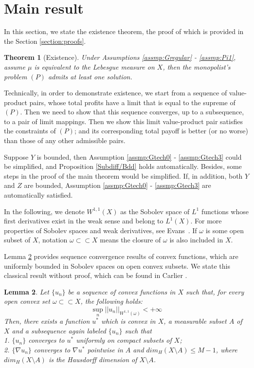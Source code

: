 \documentclass[a4paper, 11pt]{amsart}
\numberwithin{equation}{section}
\theoremstyle{plain}
\newtheorem{theorem}{Theorem}[section]
\newtheorem{lemma}[theorem]{Lemma}
\theoremstyle{definition}
\theoremstyle{remark}
\begin{document}
\section{Main result}\label{section:mainresult}
In this section, we state the existence theorem, the proof of which is provided in the Section \ref{section:proofs}. 


\begin{theorem}[Existence]
	Under Assumptions \ref{assmp:Gregular} - \ref{assmp:Pi1},  assume $\mu$ is equivalent to the Lebesgue measure on $X$, then the monopolist's problem $(P)$ admits at least one solution.
\end{theorem}

Technically, in order to demonstrate existence, we start from a sequence of value-product pairs, whose total profits have a limit that is equal to the supreme of $(P)$.
Then we need to show that this sequence converges, up to a subsequence, to a pair of limit mappings. Then we show this limit value-product pair satisfies the constraints of $(P)$; and its corresponding total payoff is better (or no worse) than those of any other admissible pairs. \medskip

Suppose $Y$ is bounded, then Assumption \ref{assmp:Gtech0} - \ref{assmp:Gtech3} could be simplified, and Proposition \ref{Subdiff/Bdd} holds automatically. Besides, some steps in the proof of the main theorem would be simplified. If, in addition, both $Y$ and $Z$ are bounded, Assumption \ref{assmp:Gtech0} - \ref{assmp:Gtech3} are automatically satisfied. \medskip

In the following, we denote $W^{1,1}(X)$ as the Sobolev space of $L^1$ functions whose first derivatives exist in the weak sense and belong to $L^1(X)$. For more properties of Sobolev spaces and weak derivatives, see Evans~\cite[Chapter 5]{Evans98}. If $\omega$ is some open subset of $X$, notation $\omega \subset \subset X$ means the closure of $\omega$ is also included in $X$.\medskip

Lemma \ref{lemma1} provides sequence convergence results of convex functions, which are uniformly bounded in Sobolev spaces on open convex subsets. We state this classical result without proof, which can be found in Carlier \cite{Carlier01}.\medskip


\begin{lemma}\label{lemma1}
	Let $\{u_n\}$ be a sequence of convex functions in $X$ such that, for every open convex set $\omega \subset \subset X$, the following holds:
	\begin{equation*}
	\sup\limits_{n} ||u_n||_{W^{1,1}(\omega)} < +\infty
	\end{equation*}
	Then, there exists a function $u^*$ %
	which is convex in $X$, a measurable subset $A$ of $X$ and a subsequence again labeled $\{u_n\}$ such that\\
	1. $\{u_n\}$ converges to $u^*$ uniformly on compact subsets of $X$;\\
	2. $\{\nabla u_n\}$ converges to $\nabla u^*$ pointwise in $A$ and $dim_{H}(X\setminus A)\le M-1$, where $dim_{H}(X\setminus A)$ is the Hausdorff dimension of $X\setminus A$.
\end{lemma}
\end{document}
